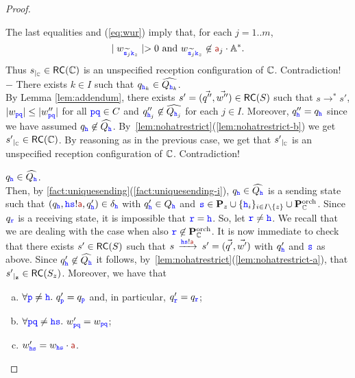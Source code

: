 \begin{proof}
\begin{description}
\begin{description}
\begin{description}
The last equalities and  (\ref{eq:wur}) imply that, for each $j = 1..m$,
$$
\mid w_{\widetilde{\tts_j}\KK_z}\mid > 0 
\text{ and } w_{\widetilde{\tts_j}\KK_z}\not\in  \msg[a]_j \cdot\mathbb{A}^*.
$$
 Thus $\restrict{s}{\cs} \in \RS(\cs)$ is an unspecified reception configuration of $\cs$. Contradiction!\\
 $-$ There exists $k\in I$ such that ${q}_{\HH_k}\in\widehat{Q_{\HH_k}}$.\\
 By Lemma \ref{lem:addendum}, there exists $s'= (\vec{q''},\vec{w''})\in \RS(S)$ 
 such that $s \to^* s'$,
 $|w_{\ttp\ttq}| \leq |w''_{\ttp\ttq}|$ for all $\ttp\ttq \in C$ and
$q''_{\HH_j}\not\in\widehat{Q_{\HH_j}}$ for each $j\in I$. 
Moreover, $q''_{\HH}=q_{\HH}$ since we have assumed ${q}_\HH\not\in \widehat{Q_\HH}$.
By~\cref{lem:nohatrestrict}(\ref{lem:nohatrestrict-b}) we get $\restrict{s'}{\cs}\in \RS(\cs)$. By reasoning as in the previous case, we get that 
$\restrict{s'}{\cs}$ is an unspecified reception configuration of $\cs$. Contradiction!
\end{description}
\end{description}
\item 
${q}_\HH\in \widehat{Q_\HH}$.\\ 
Then, by \cref{fact:uniquesending}(\ref{fact:uniquesending-i}),
${q}_\HH\in \widehat{Q_\HH}$ is a sending state such that $({q}_\HH,\HH\tts!\msg[a],q'_\HH)\in{\delta}_\HH$ with $q'_\HH \in Q_{\HH}$ and 
$\tts \in \roles_z \cup \Set{\HH_i}_{i\in I\setminus\Set{z}}\cup\rolescsint$. 
Since $q_\ttr$ is a receiving state, it is impossible that $\ttr=\HH$.
So, let $\ttr\neq\HH$. We recall that we are dealing with the case when also $\ttr\not\in\rolescsint$.
It is now immediate to check that  there exists $s'\in \RS(S)$ such that
$s\lts{\HH\tts!\msg[a]}s'=(\vec{q'},\vec{w'})$ with $q'_\HH$ and $\tts$ as above.
Since $q'_\HH\not\in \widehat{Q_\HH}$ it
follows, by~\cref{lem:nohatrestrict}(\ref{lem:nohatrestrict-a}), that $\restrict{s'}{z} \in \RS(S_z)$.
Moreover, we have that 
\begin{enumerate}[a)]
\item
\label{l:aa}
$\forall \ttp\neq\HH.\ q'_\ttp = {q}_\ttp$ and,
in particular, $q'_\ttr = {q}_\ttr$;
\item
\label{l:bb}
$\forall \ttp\ttq \neq \HH\tts.\ w'_{\ttp\ttq} = {w}_{\ttp\ttq}$;
\item
\label{l:cc}
$w'_{\HH\tts} = {w}_{\HH\tts}\cdot \msg[a]$.
\end{enumerate}

\end{description}
\end{proof}
